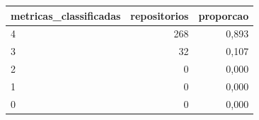\begin{tabular}{lrr}
\hline
metricas\_classificadas & repositorios & proporcao \\
\hline
4 & 268 & 0,893 \\
3 & 32 & 0,107 \\
2 & 0 & 0,000 \\
1 & 0 & 0,000 \\
0 & 0 & 0,000 \\
\hline
\end{tabular}
